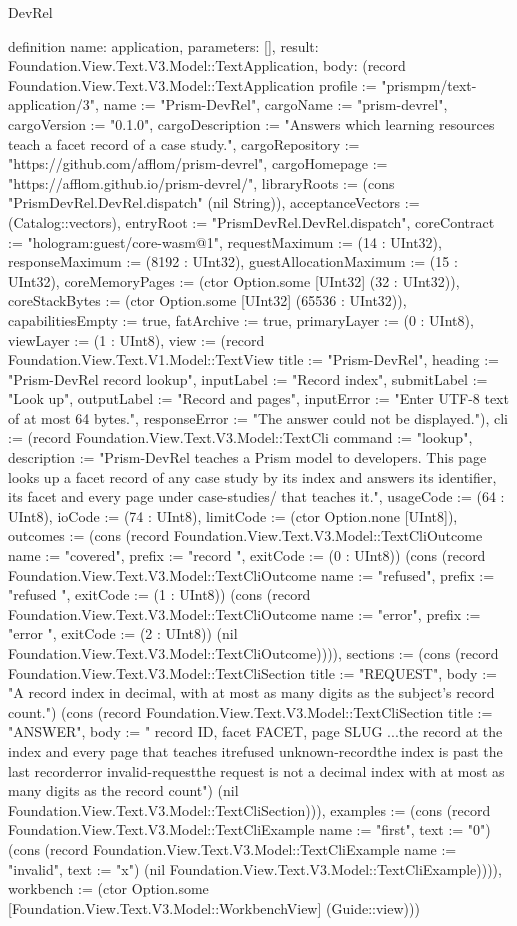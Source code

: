 \begin{lexlean}{DevRel}
\begin{semanticmodule}
definition{
  name: application,
  parameters: [],
  result: Foundation.View.Text.V3.Model::TextApplication,
  body: (record Foundation.View.Text.V3.Model::TextApplication {profile := "prismpm/text-application/3", name := "Prism-DevRel", cargoName := "prism-devrel", cargoVersion := "0.1.0", cargoDescription := "Answers which learning resources teach a facet record of a case study.", cargoRepository := "https://github.com/afflom/prism-devrel", cargoHomepage := "https://afflom.github.io/prism-devrel/", libraryRoots := (cons "PrismDevRel.DevRel.dispatch" (nil String)), acceptanceVectors := (Catalog::vectors), entryRoot := "PrismDevRel.DevRel.dispatch", coreContract := "hologram:guest/core-wasm@1", requestMaximum := (14 : UInt32), responseMaximum := (8192 : UInt32), guestAllocationMaximum := (15 : UInt32), coreMemoryPages := (ctor Option.some [UInt32] (32 : UInt32)), coreStackBytes := (ctor Option.some [UInt32] (65536 : UInt32)), capabilitiesEmpty := true, fatArchive := true, primaryLayer := (0 : UInt8), viewLayer := (1 : UInt8), view := (record Foundation.View.Text.V1.Model::TextView {title := "Prism-DevRel", heading := "Prism-DevRel record lookup", inputLabel := "Record index", submitLabel := "Look up", outputLabel := "Record and pages", inputError := "Enter UTF-8 text of at most 64 bytes.", responseError := "The answer could not be displayed."}), cli := (record Foundation.View.Text.V3.Model::TextCli {command := "lookup", description := "Prism-DevRel teaches a Prism model to developers. This page looks up a facet record of any case study by its index and answers its identifier, its facet and every page under case-studies/ that teaches it.\n", usageCode := (64 : UInt8), ioCode := (74 : UInt8), limitCode := (ctor Option.none [UInt8]), outcomes := (cons (record Foundation.View.Text.V3.Model::TextCliOutcome {name := "covered", prefix := "record ", exitCode := (0 : UInt8)}) (cons (record Foundation.View.Text.V3.Model::TextCliOutcome {name := "refused", prefix := "refused ", exitCode := (1 : UInt8)}) (cons (record Foundation.View.Text.V3.Model::TextCliOutcome {name := "error", prefix := "error ", exitCode := (2 : UInt8)}) (nil Foundation.View.Text.V3.Model::TextCliOutcome)))), sections := (cons (record Foundation.View.Text.V3.Model::TextCliSection {title := "REQUEST", body := "A record index in decimal, with at most as many digits as the subject's record count.\n"}) (cons (record Foundation.View.Text.V3.Model::TextCliSection {title := "ANSWER", body := "    record ID, facet FACET, page SLUG ...\n        the record at the index and every page that teaches it\n    refused unknown-record\n        the index is past the last record\n    error invalid-request\n        the request is not a decimal index with at most as many digits as the record count\n"}) (nil Foundation.View.Text.V3.Model::TextCliSection))), examples := (cons (record Foundation.View.Text.V3.Model::TextCliExample {name := "first", text := "0"}) (cons (record Foundation.View.Text.V3.Model::TextCliExample {name := "invalid", text := "x"}) (nil Foundation.View.Text.V3.Model::TextCliExample)))}), workbench := (ctor Option.some [Foundation.View.Text.V3.Model::WorkbenchView] (Guide::view))})
}
\end{semanticmodule}
\end{lexlean}
